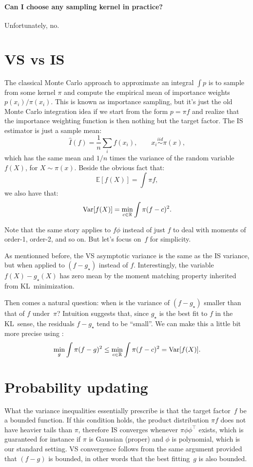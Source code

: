 \documentclass{article}
\begin{document}
\paragraph{Can I choose any sampling kernel in practice?} Unfortunately, no.



\section{VS vs IS}

The classical Monte Carlo approach to approximate an integral $\int p$ is to sample from some kernel $\pi$ and compute the empirical mean of importance weights $p(x_i)/\pi(x_i)$. This is known as importance sampling, but it's just the old Monte Carlo integration idea if we start from the form $p=\pi f$ and realize that the importance weighting function is then nothing but the target factor. The IS estimator is just a sample mean:
$$
\hat{I}(f) = \frac{1}{n}\sum_i f(x_i),
\qquad x_i \stackrel{iid}{\sim} \pi(x),
$$
which has the same mean and $1/n$ times the variance of the random variable $f(X)$, for $X\sim\pi(x)$. Beside the obvious fact that:
$$
\mathbb{E}[f(X)] = \int\pi f,
$$
we also have that:
$$
{\rm Var}[f(X)]
= \min_{c\in\mathbb{R}} \int \pi (f - c)^2.
$$

Note that the same story applies to $f\phi$ instead of just $f$ to deal with moments of order-1, order-2, and so on. But let's focus on~$f$ for simplicity.

As mentionned before, the VS asymptotic variance is the same as the IS variance, but when applied to $(f-g_\star)$ instead of $f$. Interestingly, the variable $f(X)-g_\star(X)$ has zero mean by the moment matching property inherited from KL~minimization.

Then comes a natural question: when is the variance of $(f-g_\star)$ smaller than that of $f$ under~$\pi$? Intuition suggests that, since $g_\star$ is the best fit to $f$ in the KL~sense, the residuals $f-g_\star$ tend to be ``small''. We can make this a little bit more precise using :
$$
\min_g \int \pi (f-g)^2 \leq \min_{c\in\mathbb{R}} \int \pi (f-c)^2 = {\rm Var}[f(X)].
$$



\section{Probability updating}

What the variance inequalities essentially prescribe is that the target factor~$f$ be a bounded function. If this condition holds, the product distribution $\pi f$ does not have heavier tails than $\pi$, therefore IS converges whenever $\pi \phi\phi^\top$ exists, which is guaranteed for instance if $\pi$ is Gaussian (proper) and  $\phi$ is polynomial, which is our standard setting. VS convergence follows from the same argument provided that $(f-g)$ is bounded, in other words that the best fitting~$g$ is also bounded. 
\end{document}
